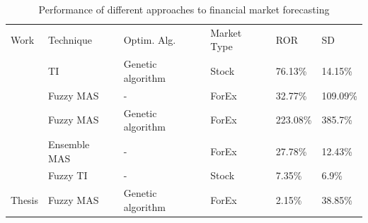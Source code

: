 \begin{table}[ht]
\caption{Performance of different approaches to financial market forecasting}
\label{table:results}
\begin{tabular}{llllll}
Work                                         & Technique                  & Optim. Alg. & Market Type              & ROR & SD \\
\cite{Fernandez-Blanco2008} & TI            & Genetic algorithm         & Stock             & 76.13\%     & 14.15\%            \\
\cite{Korczak2015}          & Fuzzy MAS        & -                      & ForEx & 32.77\%     & 109.09\%           \\
\cite{Korczak2016}          & Fuzzy MAS        & Genetic algorithm      & ForEx & 223.08\%    & 385.7\%            \\
\cite{Barbosa2010}          & Ensemble MAS     & -                      & ForEx & 27.78\%     & 12.43\%            \\
\cite{Escobar2013}          & Fuzzy TI         & -                      & Stock             & 7.35\%      & 6.9\%              \\
Thesis             & Fuzzy MAS        & Genetic algorithm      & ForEx & 2.15\%      & 38.85\%           
\end{tabular}
\end{table}